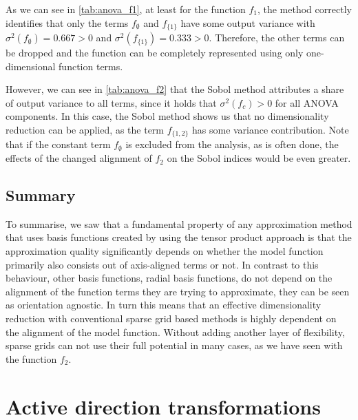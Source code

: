\documentclass[
  a4paper,  %
  twoside,  %
  bibliography=totoc,
  headsepline,
  cleardoublepage=empty,
  parskip=half,
  draft=false
]{scrbook}
\begin{document}
As we can see in \cref{tab:anova_f1}, at least for the function $f_1$, the method correctly identifies that only the terms $f_\emptyset$ and $f_{\{1\}}$ have some output variance with $\sigma^2(f_\emptyset)=0.667 > 0$ and $\sigma^2(f_{\{1\}})=0.333 > 0$.
Therefore, the other terms can be dropped and the function can be completely represented using only one-dimensional function terms.

However, we can see in \cref{tab:anova_f2} that the Sobol method attributes a share of output variance to all terms, since  it holds that $\sigma^2(f_{c}) > 0$ for all ANOVA components.
In this case, the Sobol method shows us that no dimensionality reduction can be applied, as the term $f_{\{1,2\}}$ has some variance contribution.
Note that if the constant term $f_\emptyset$ is excluded from the analysis, as is often done, the effects of the changed alignment of $f_2$ on the Sobol indices would be even greater.

\subsection{Summary}

To summarise, we saw that a fundamental property of any approximation method that uses basis functions created by using the tensor product approach is that the approximation quality significantly depends on whether the model function primarily also consists out of axis-aligned terms or not.
In contrast to this behaviour, other basis functions, \eg radial basis functions, do not depend on the alignment of the function terms they are trying to approximate, \ie they can be seen as orientation agnostic.
In turn this means that an effective dimensionality reduction with conventional sparse grid based methods is highly dependent on the alignment of the model function.
Without adding another layer of flexibility, sparse grids can not use their full potential in many cases, as we have seen with the function $f_2$.

\section{Active direction transformations}
\end{document}
